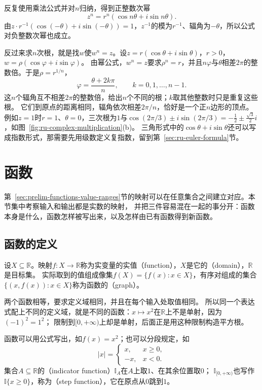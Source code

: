 反复使用乘法公式并对$n$归纳，得到正整数次幂
\[
 z^n=r^n(\cos n\theta+i\sin n\theta).
\]
由$z\cdot r^{-1}(\cos(-\theta)+i\sin(-\theta))=1$，$z^{-1}$的模为$r^{-1}$、辐角为$-\theta$，所以公式对负整数次幂也成立。

反过来求$n$次根，就是找$w$使$w^n=z$。设$z=r(\cos\theta+i\sin\theta)$，$r>0$，$w=\rho(\cos\varphi+i\sin\varphi)$。
由幂公式，$w^n=z$要求$\rho^n=r$，并且$n\varphi$与$\theta$相差$2\pi$的整数倍。于是$\rho=r^{1/n}$，
\[
 \varphi=\frac{\theta+2k\pi}{n},\qquad k=0,1,\ldots,n-1.
\]
这$n$个辐角互不相差$2\pi$的整数倍，给出$n$个不同的根；$k$取其他整数时只是重复这些根。
它们到原点的距离相同，辐角依次相差$2\pi/n$，恰好是一个正$n$边形的顶点。
例如$z=1$时$r=1$、$\theta=0$，三次根为$1$与$\cos(2\pi/3)\pm i\sin(2\pi/3)=-\tfrac12\pm\tfrac{\sqrt3}2i$，如图~\ref{fig:ru-complex-multiplication}(b)。
三角形式中的$\cos\theta+i\sin\theta$还可以写成指数形式，那需要先用级数定义复指数，留到第~\ref{sec:ru-euler-formula}节。
\section{函数}
\label{sec:ru-functions}

第~\ref{sec:prelim-functions-value-ranges}节的映射可以在任意集合之间建立对应。本节集中考察输入和输出都是实数的映射，
并把三件容易混在一起的事分开：函数本身是什么，函数怎样被写出来，以及怎样由已有函数得到新函数。

\subsection{函数的定义}
\label{sec:ru-function-definition}

设$X\subseteq\mathbb R$。映射$f:X\to\mathbb R$称为实变量的实值（function），$X$是它的（domain），$\mathbb R$是目标集。
实际取到的值组成像集$f(X)=\{f(x):x\in X\}$，有序对组成的集合$\{(x,f(x)):x\in X\}$称为函数的（graph）。

两个函数相等，要求定义域相同，并且在每个输入处取值相同。
所以同一个表达式配上不同的定义域，就是不同的函数：$x\mapsto x^2$在$\mathbb R$上不是单射，因为$(-1)^2=1^2$；
限制到$[0,+\infty)$上却是单射，后面正是用这种限制构造平方根。

函数可以用公式写出，如$f(x)=x^2$；也可以分段规定，如
\[
 |x|=\begin{cases}x,&x\geq0,\\-x,&x<0.\end{cases}
\]
集合$A\subseteq\mathbb R$的（indicator function）$\mathbb I_A$在$A$上取$1$、在其余位置取$0$；
$\mathbb I_{[0,+\infty)}$也写作$\mathbb I\{x\geq0\}$，称为（step function），它在原点从$0$跳到$1$。

